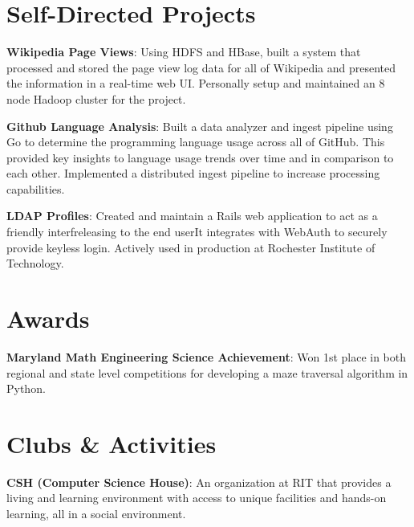 \documentclass[a4paper,margin,line]{resume}
\begin{document}
\begin{resume}
\section{\mysidestyle Self-Directed Projects}
    \begin{asparablank}
        \item \textbf{Wikipedia Page Views}: Using HDFS and HBase, built a system that
            processed and stored the page view log data for all of Wikipedia 
            and presented the information in a real-time web UI. Personally setup and 
            maintained an 8 node Hadoop cluster for the project. \\
        \item \textbf{Github Language Analysis}: Built a data analyzer and
            ingest pipeline using Go to determine the programming language 
            usage across all of GitHub. This provided key insights to language usage
            trends over time and in comparison to each other. Implemented a 
            distributed ingest pipeline to increase processing capabilities. \\
        \item \textbf{LDAP Profiles}: Created and maintain a Rails web 
            application to act as a friendly interfreleasing to the end userIt integrates with WebAuth to securely provide keyless login. 
            Actively used in production at Rochester Institute of Technology.
    \end{asparablank}
\section{\mysidestyle Awards}
    \begin{asparablank}
        \item \textbf{Maryland Math Engineering Science Achievement}: Won 1st place
            in both regional and state level competitions for developing a maze
            traversal algorithm in Python. 
    \end{asparablank}
\section{\mysidestyle Clubs \& Activities}
    \begin{asparablank}
        \item \textbf{CSH (Computer Science House)}: An organization at RIT that
            provides a living and learning environment with access to unique facilities
            and hands-on learning, all in a social environment.
    \end{asparablank}
\end{resume}
\end{document}
